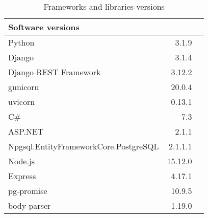 
\FloatBarrier
\begin{table}[!htp]\centering
    \caption{Frameworks and libraries versions}\label{tab:software}
    \scriptsize
    \begin{tabular}{lrr}\toprule
        Software versions                     &         \\\midrule
        Python                                & 3.1.9   \\
        Django                                & 3.1.4   \\
        Django REST Framework                 & 3.12.2  \\
        gunicorn                              & 20.0.4  \\
        uvicorn                               & 0.13.1  \\\midrule
        C\#                                   & 7.3     \\
        ASP.NET                               & 2.1.1   \\
        Npgsql.EntityFrameworkCore.PostgreSQL & 2.1.1.1 \\\midrule
        Node.js                               & 15.12.0 \\
        Express                               & 4.17.1  \\
        pg-promise                            & 10.9.5  \\
        body-parser                           & 1.19.0  \\
        \bottomrule
    \end{tabular}
\end{table}
\FloatBarrier
